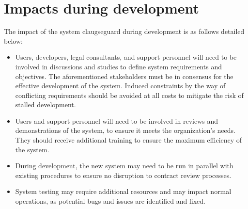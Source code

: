 \section{Impacts during development\label{Section::Impacts During Development}} 
The impact of the system claugseguard during development is as follows detailed below: 
\begin{itemize}
    \item Users, developers, legal consultants, and support personnel will need to be involved in discussions and studies to define system requirements and objectives. The aforementioned stakeholders must be in consensus for the effective development of the system. Induced constraints by the way of conflicting requirements should be avoided at all costs to mitigate the risk of stalled development. 
    
    \item Users and support personnel will need to be involved in reviews and demonstrations of the system, to ensure it meets the organization's needs. They should receive additional training to ensure the maximum efficiency of the system. 

    \item During development, the new system may need to be run in parallel with existing procedures to ensure no disruption to contract review processes.



    \item System testing may require additional resources and may impact normal operations, as potential bugs and issues are identified and fixed.







\end{itemize}





